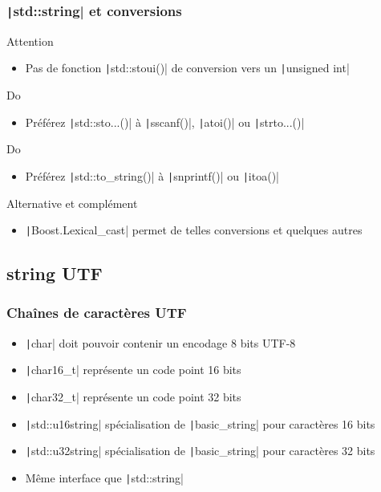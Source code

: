 \documentclass[C++.tex]{subfiles}
\begin{document}
\begin{frame}[fragile]
	\frametitle{\texttt|std::string| et conversions}
	\begin{alertblock}{Attention}
		\begin{itemize}
			\item Pas de fonction \texttt|std::stoui()| de conversion vers un \texttt|unsigned int|
		\end{itemize}
	\end{alertblock}

	\begin{exampleblock}{Do}
		\begin{itemize}
			\item Préférez \texttt|std::sto...()| à \texttt|sscanf()|, \texttt|atoi()| ou \texttt|strto...()|
		\end{itemize}
	\end{exampleblock}

	\begin{exampleblock}{Do}
		\begin{itemize}
			\item Préférez \texttt|std::to_string()| à \texttt|snprintf()| ou \texttt|itoa()|
		\end{itemize}
	\end{exampleblock}

	\begin{block}{Alternative et complément}
		\begin{itemize}
			\item \texttt|Boost.Lexical_cast| permet de telles conversions et quelques autres
		\end{itemize}
	\end{block}
\end{frame}

\subsection*{string UTF}
\begin{frame}[fragile]
	\frametitle{Chaînes de caractères UTF}
	\begin{itemize}
		\item \texttt|char| doit pouvoir contenir un encodage 8 bits UTF-8


		\item \texttt|char16_t| représente un code point 16 bits
		\item \texttt|char32_t| représente un code point 32 bits
		\item \texttt|std::u16string| spécialisation de \texttt|basic_string| pour caractères 16 bits
		\item \texttt|std::u32string| spécialisation de \texttt|basic_string| pour caractères 32 bits
		\item Même interface que \texttt|std::string|
	\end{itemize}

\end{frame}
\end{document}
